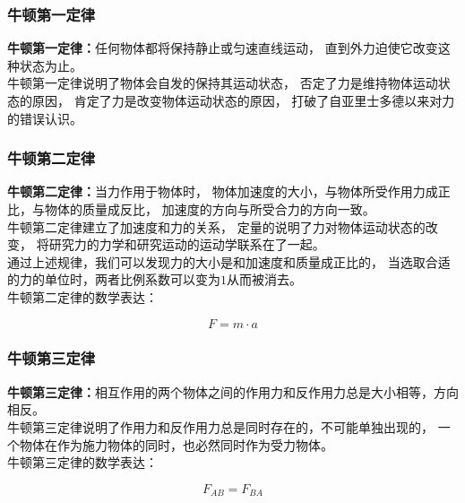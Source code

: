 \documentclass[UTF8]{ctexart}
\begin{document}
\subsubsection{牛顿第一定律}
    \textbf{牛顿第一定律：}任何物体都将保持静止或匀速直线运动，
    直到外力迫使它改变这种状态为止。\\[3mm]
    牛顿第一定律说明了物体会自发的保持其运动状态，
    否定了力是维持物体运动状态的原因，
    肯定了力是改变物体运动状态的原因，
    打破了自亚里士多德以来对力的错误认识。\vspace{8pt}

\subsubsection{牛顿第二定律}
    \textbf{牛顿第二定律：}当力作用于物体时，
    物体加速度的大小，与物体所受作用力成正比，与物体的质量成反比，
    加速度的方向与所受合力的方向一致。\\[3mm]
    牛顿第二定律建立了加速度和力的关系，
    定量的说明了力对物体运动状态的改变，
    将研究力的力学和研究运动的运动学联系在了一起。\\[3mm]
    通过上述规律，我们可以发现力的大小是和加速度和质量成正比的，
    当选取合适的力的单位时，两者比例系数可以变为$1$从而被消去。\\[3mm]
    牛顿第二定律的数学表达：
    \begin{large}
        \begin{equation*}
            F=m\cdot a
        \end{equation*}
    \end{large}
    \vspace{-10pt}

\subsubsection{牛顿第三定律}
    \textbf{牛顿第三定律：}相互作用的两个物体之间的作用力和反作用力总是大小相等，方向相反。\\[3mm]
    牛顿第三定律说明了作用力和反作用力总是同时存在的，不可能单独出现的，
    一个物体在作为施力物体的同时，也必然同时作为受力物体。\\[3mm]
    牛顿第三定律的数学表达：
    \begin{large}
        \begin{equation*}
            F_{AB}=F_{BA}
        \end{equation*}
    \end{large}

\newpage
\end{document}
